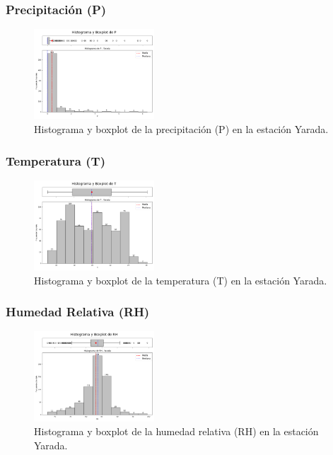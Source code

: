 \subsubsection*{Precipitación (P)}
\begin{figure}[H]
\centering
\includegraphics[width=0.4\textwidth]{resultados/por_estacion_meteorologica/Yarada/P_histograma.png}
\caption{Histograma y boxplot de la precipitación (P) en la estación Yarada.}
\label{fig:yarada_P}
\end{figure}

\subsubsection*{Temperatura (T)}
\begin{figure}[H]
\centering
\includegraphics[width=0.4\textwidth]{resultados/por_estacion_meteorologica/Yarada/T_histograma.png}
\caption{Histograma y boxplot de la temperatura (T) en la estación Yarada.}
\label{fig:yarada_T}
\end{figure}

\subsubsection*{Humedad Relativa (RH)}
\begin{figure}[H]
\centering
\includegraphics[width=0.4\textwidth]{resultados/por_estacion_meteorologica/Yarada/RH_histograma.png}
\caption{Histograma y boxplot de la humedad relativa (RH) en la estación Yarada.}
\label{fig:yarada_RH}
\end{figure}

